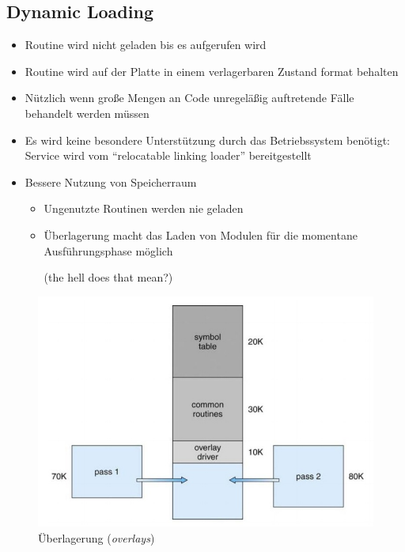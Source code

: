 \documentclass[a4paper]{scrreprt}
\begin{document}
\subsection{Dynamic Loading}
\begin{itemize}
\item Routine wird nicht geladen bis es aufgerufen wird
\item Routine wird auf der Platte in einem verlagerbaren Zustand format behalten
\item Nützlich wenn große  Mengen an Code unregeläßig auftretende Fälle behandelt werden müssen
\item Es wird keine besondere Unterstützung durch das Betriebssystem benötigt: Service wird vom "`relocatable linking loader"' bereitgestellt
\item Bessere Nutzung von Speicherraum
\begin{itemize}
\item Ungenutzte Routinen werden nie geladen
\item Überlagerung macht das Laden von Modulen für die momentane Ausführungsphase möglich \begin{tiny}
(the hell does that mean?)
\end{tiny}
\end{itemize}
\end{itemize}

\begin{figure}[ht]
\centering
\includegraphics[scale=0.50]{graphics/overlays.png}
\caption{Überlagerung (\textit{overlays})}
\end{figure}
\end{document}
